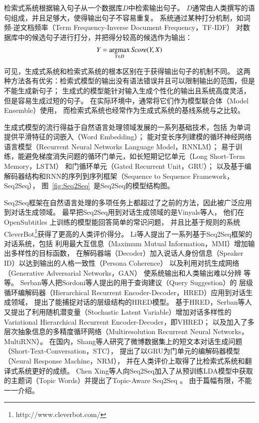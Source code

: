 检索式系统根据输入句子从一个数据库$D$中检索输出句子。
$D$通常由人类撰写的语句组成，并且足够大，使得输出句子不容易重复。
系统通过某种打分机制，如词频-逆文档频率（Term Frequency-Inverse Document Frequency，TF-IDF）
对数据库中的候选句子进行打分，并把得分较高的候选作为输出：
\begin{align}
    Y = \operatorname*{argmax}_{Y\in D} \textit{Score}(Y, X)
\end{align}

可见，生成式系统和检索式系统的根本区别在于获得输出句子的机制不同。
这两种方法各有优劣：检索式模型的输出没有语法错误并且可以限制输出的范围，但是不能生成新句子；
生成式的模型能针对输入生成个性化的输出且系统高度灵活，但是容易生成过短的句子。
在实际环境中，通常将它们作为模型联合体（Model Ensemble）使用，
而检索式系统也经常作为生成式系统的基线系统与之比较。

生成式模型的流行得益于自然语言处理领域发展的一系列基础技术，包括
为单词提供平滑特征的词嵌入（Word Embedding）；
能对变长序列建模的循环神经网络语言模型（Recurrent Neural Networks Language Model，RNNLM）；
易于训练，能避免梯度消失问题的循环门单元，如长短期记忆单元（Long Short-Term Memory，LSTM）
和门循环单元（Gated Recurrent Unit，GRU）；
以及基于编解码器结构和RNN的序列到序列框架（Sequence to Sequence Framework，Seq2Seq），
图~\ref{fig:Seq2Seq}~是Seq2Seq的模型结构图。

Seq2Seq框架在自然语言处理的多项任务上都超过了之前的方法，因此被广泛应用到对话生成领域。
最早把Seq2Seq用到对话生成领域的是Vinyals等人，
他们在OpenSubtitles
上训练的模型能回答简单的常识问题，
并且比基于规则的系统CleverBot\footnote{http://www.cleverbot.com/}获得了更高的人类评价得分。
Li等人提出了一系列基于Seq2Seq框架的对话系统，包括
利用最大互信息（Maximum Mutual Information，MMI）增加输出多样性的目标函数，
在解码器端（Decoder）加入说话人身份信息（Speaker ID）以达到输出的人格一致性（Persona Coherence）
以及利用对抗生成网络（Generative Adversarial Networks，GAN）
使系统输出和人类输出难以分辨 等等。
Serban等人把Sordoni等人提出的用于查询建议（Query Suggestion）的
层级循环编解码器（Hierarchical Recurrent Encoder-Decoder，HRED）应用到对话生成领域，
提出了能捕捉对话的层级结构的HRED模型。
基于HRED，Serban等人又提出了利用随机潜变量（Stochastic Latent Variable）增加对话多样性的Variational Hierarchical Recurrent Encoder-Decoder，即VHRED；
以及加入了多层次抽象信息的多精度循环网络（Multiresolution Recurrent Neural Networks，MultiRNN）。
在国内，Shang等人研究了微博数据集上的短文本对话生成问题（Short-Text-Conversation，STC），
提出了以GRU为门单元的编解码器模型（Neural Response Machine，NRM），
并在人类评价上取得了比检索式系统和翻译式系统更好的成绩。
Chen Xing等人向Seq2Seq加入了从预训练LDA模型中获取的主题词（Topic Words）并提出了Topic-Aware Seq2Seq 。
由于篇幅有限，不能一一介绍。

